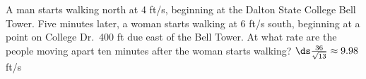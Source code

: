 {A man starts walking north at 4 ft/s, beginning at the Dalton State College Bell Tower.  Five minutes later, a woman starts walking at 6 ft/s south, beginning at a point on College Dr.\ 400 ft due east of the Bell Tower.  At what rate are the people moving apart ten minutes after the woman starts walking?
}
{$\ds \frac{36}{\sqrt{13}}\approx 9.98$ ft/s
}

